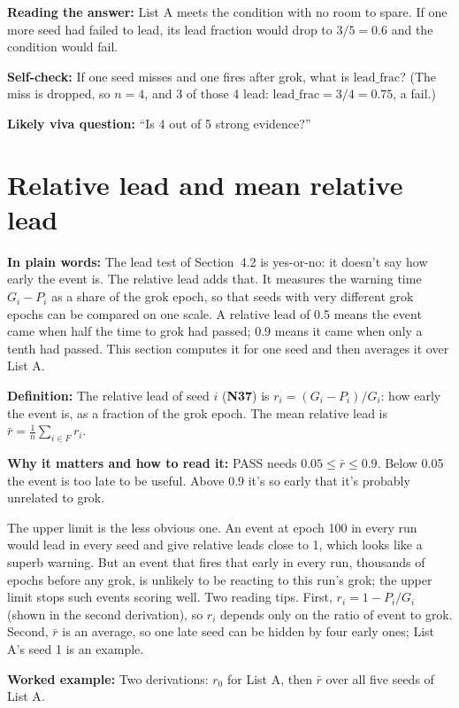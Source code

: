 \documentclass[11pt,a4paper,oneside,openany]{report}
\newcommand{\leadfrac}{\mathrm{lead\_frac}}
\newcommand{\rbar}{\bar{r}}
\newcommand{\gl}[1]{\textbf{#1}}   %
\newcommand{\fplain}{\textbf{In plain words:} }
\newcommand{\fdef}{\textbf{Definition:} }
\newcommand{\fread}{\par\textbf{Why it matters and how to read it:} }
\newcommand{\fans}{\par\textbf{Reading the answer:} }
\newcommand{\fex}{\par\textbf{Worked example:} }
\newcommand{\fself}{\par\textbf{Self-check:} }
\newcommand{\fviva}{\par\textbf{Likely viva question:} }
\begin{document}
\fans List A meets the condition with no room to spare. If one more seed had failed to lead, its lead fraction would drop to $3/5 = 0.6$ and the condition would fail.

\fself If one seed misses and one fires after grok, what is $\leadfrac$? (The miss is dropped, so $n = 4$, and 3 of those 4 lead: $\leadfrac = 3/4 = 0.75$, a fail.)
\fviva ``Is 4 out of 5 strong evidence?''

\section{Relative lead and mean relative lead}
\fplain The lead test of Section~4.2 is yes-or-no: it doesn't say how early the event is. The relative lead adds that. It measures the warning time $G_i - P_i$ as a share of the grok epoch, so that seeds with very different grok epochs can be compared on one scale. A relative lead of 0.5 means the event came when half the time to grok had passed; 0.9 means it came when only a tenth had passed. This section computes it for one seed and then averages it over List A.

\fdef The relative lead of seed $i$ (\gl{N37}) is $r_i = (G_i - P_i) / G_i$: how early the event is, as a fraction of the grok epoch. The mean relative lead is $\rbar = \frac{1}{n}\sum_{i \in F} r_i$.
\fread PASS needs $0.05 \le \rbar \le 0.9$. Below 0.05 the event is too late to be useful. Above 0.9 it's so early that it's probably unrelated to grok.

The upper limit is the less obvious one. An event at epoch 100 in every run would lead in every seed and give relative leads close to 1, which looks like a superb warning. But an event that fires that early in every run, thousands of epochs before any grok, is unlikely to be reacting to this run's grok; the upper limit stops such events scoring well. Two reading tips. First, $r_i = 1 - P_i/G_i$ (shown in the second derivation), so $r_i$ depends only on the ratio of event to grok. Second, $\rbar$ is an average, so one late seed can be hidden by four early ones; List A's seed 1 is an example.

\fex Two derivations: $r_0$ for List A, then $\rbar$ over all five seeds of List A.
\end{document}
